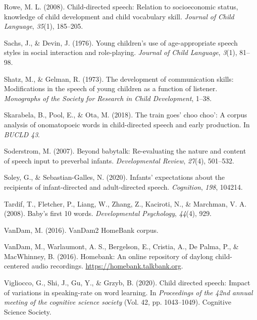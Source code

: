 \documentclass[10pt, letterpaper]{article}
\newenvironment{CSLReferences}%
  {}%
  {\par}
\begin{document}
\begin{CSLReferences}{1}{0}
\leavevmode\hypertarget{ref-rowe2008child}{}%
Rowe, M. L. (2008). Child-directed speech: Relation to socioeconomic
status, knowledge of child development and child vocabulary skill.
\emph{Journal of Child Language}, \emph{35}(1), 185--205.

\leavevmode\hypertarget{ref-sachs1976young}{}%
Sachs, J., \& Devin, J. (1976). Young children's use of age-appropriate
speech styles in social interaction and role-playing. \emph{Journal of
Child Language}, \emph{3}(1), 81--98.

\leavevmode\hypertarget{ref-shatz1973development}{}%
Shatz, M., \& Gelman, R. (1973). The development of communication
skills: Modifications in the speech of young children as a function of
listener. \emph{Monographs of the Society for Research in Child
Development}, 1--38.

\leavevmode\hypertarget{ref-skarabela2018train}{}%
Skarabela, B., Pool, E., \& Ota, M. (2018). The train goes' choo choo':
A corpus analysis of onomatopoeic words in child-directed speech and
early production. In \emph{BUCLD 43}.

\leavevmode\hypertarget{ref-soderstrom2007beyond}{}%
Soderstrom, M. (2007). Beyond babytalk: Re-evaluating the nature and
content of speech input to preverbal infants. \emph{Developmental
Review}, \emph{27}(4), 501--532.

\leavevmode\hypertarget{ref-soley2020infants}{}%
Soley, G., \& Sebastian-Galles, N. (2020). Infants' expectations about
the recipients of infant-directed and adult-directed speech.
\emph{Cognition}, \emph{198}, 104214.

\leavevmode\hypertarget{ref-tardif2008baby}{}%
Tardif, T., Fletcher, P., Liang, W., Zhang, Z., Kaciroti, N., \&
Marchman, V. A. (2008). Baby's first 10 words. \emph{Developmental
Psychology}, \emph{44}(4), 929.

\leavevmode\hypertarget{ref-vandamcorpus}{}%
VanDam, M. (2016). VanDam2 HomeBank corpus.

\leavevmode\hypertarget{ref-homebank}{}%
VanDam, M., Warlaumont, A. S., Bergelson, E., Cristia, A., De Palma, P.,
\& MacWhinney, B. (2016). Homebank: An online repository of daylong
child-centered audio recordings. \url{https://homebank.talkbank.org}.

\leavevmode\hypertarget{ref-vigliocco2020child}{}%
Vigliocco, G., Shi, J., Gu, Y., \& Grzyb, B. (2020). Child directed
speech: Impact of variations in speaking-rate on word learning. In
\emph{Proceedings of the 42nd annual meeting of the cognitive science
society} (Vol. 42, pp. 1043--1049). Cognitive Science Society.


\end{CSLReferences}
\end{document}
